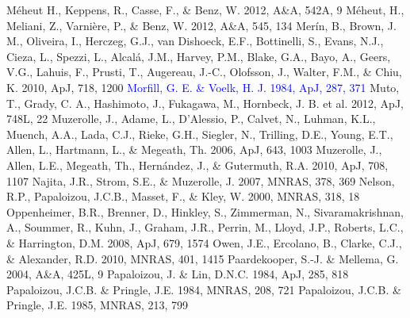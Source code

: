 \documentclass[apj]{emulateapj}
\def\blue#1{\textcolor{blue}{ #1}}
\begin{document}
\begin{thebibliography}{}
 M\'eheut H., Keppens,  R., Casse, F., \& Benz, W. 2012, A\&A, 542A, 9
 M\'eheut, H., Meliani, Z., Varni\`ere, P., \& Benz, W. 2012, A\&A, 545, 134
 Mer\'in, B., Brown, J. M., Oliveira, I., Herczeg, G.J., van Dishoeck, E.F., Bottinelli, S., Evans, N.J., Cieza, L., Spezzi, L., Alcal\'a, J.M., Harvey, P.M., Blake, G.A., Bayo, A., Geers, V.G., Lahuis, F., Prusti, T., Augereau, J.-C., Olofsson, J., Walter, F.M., \& Chiu, K. 2010, ApJ, 718, 1200
\bibitem[{{\blue{Morfill \& V\"olk}}(1984)}]{Morfill-Volk84}\blue{Morfill, G. E. \& Voelk, H. J. 1984, ApJ, 287, 371}
 Muto, T., Grady, C. A., Hashimoto, J., Fukagawa, M., Hornbeck, J. B. et al. 2012, ApJ, 748L, 22
 Muzerolle, J., Adame, L., D'Alessio, P., Calvet, N., Luhman, K.L., Muench, A.A., Lada, C.J., Rieke, G.H., Siegler, N., Trilling, D.E., Young, E.T., Allen, L., Hartmann, L., \& Megeath, Th. 2006, ApJ, 643, 1003
 Muzerolle, J., Allen, L.E., Megeath, Th., Hern\'andez, J., \& Gutermuth, R.A. 2010, ApJ, 708, 1107
 Najita, J.R., Strom, S.E., \& Muzerolle, J. 2007, MNRAS, 378, 369
 Nelson, R.P., Papaloizou, J.C.B., Masset, F., \& Kley, W. 2000, MNRAS, 318, 18
 Oppenheimer, B.R., Brenner, D., Hinkley, S., Zimmerman, N., Sivaramakrishnan, A., Soummer, R., Kuhn, J., Graham, J.R., Perrin, M., Lloyd, J.P., Roberts, L.C., \& Harrington, D.M. 2008, ApJ, 679, 1574
 Owen, J.E., Ercolano, B., Clarke, C.J., \& Alexander, R.D. 2010, MNRAS, 401, 1415
 Paardekooper, S.-J. \& Mellema, G.	2004, A\&A, 425L, 9
 Papaloizou, J. \& Lin, D.N.C. 1984, ApJ, 285, 818
 Papaloizou, J.C.B. \& Pringle, J.E. 1984, MNRAS, 208, 721
 Papaloizou, J.C.B. \& Pringle, J.E. 1985, MNRAS, 213, 799

\end{thebibliography}
\end{document}
